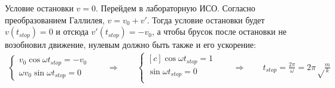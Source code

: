 \documentclass[a5paper,10pt]{article}
\begin{document}
Условие остановки $v=0$.
Перейдем в лабораторную ИСО. Согласно преобразованием Галлилея, $v=v_0+v'$. Тогда условие остановки будет $v(t_{stop})=0$ и отсюда $v'(t_{stop})=-v_0$, а чтобы брусок после остановки не возобновил движение, нулевым должно быть также и его ускорение:
\begin{gather*}
    \left\{\begin{aligned}
        {v_0}\cos{\omega{t_{stop}}}=-v_0\\
        \omega{v_0}\sin{\omega{t_{stop}}}=0
    \end{aligned}\right. \qquad\Rightarrow\qquad\left\{
    \begin{aligned}[c]
        \cos\omega{t_{stop}}=1\\
        \sin\omega{t_{stop}}=0\\
    \end{aligned}\right.\qquad\Rightarrow\qquad
    t_{stop}=\frac{2\pi}\omega=2\pi\sqrt\frac{m}{k}
\end{gather*}
\end{document}

